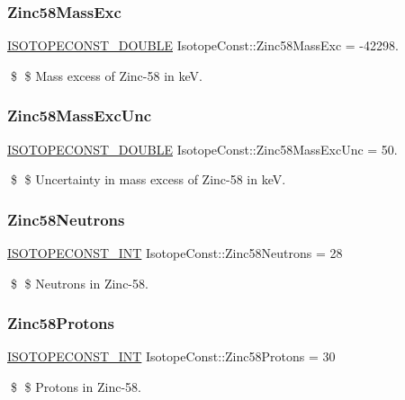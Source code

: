 \subsubsection{\texorpdfstring{Zinc58\+Mass\+Exc}{Zinc58MassExc}}
{\footnotesize\ttfamily \mbox{\hyperlink{group___isotope_const-_macros_ga8f45a7272ce02c0b4c65c44636ed719a}{I\+S\+O\+T\+O\+P\+E\+C\+O\+N\+S\+T\+\_\+\+D\+O\+U\+B\+LE}} Isotope\+Const\+::\+Zinc58\+Mass\+Exc = -\/42298.}

\$ \$ Mass excess of Zinc-\/58 in keV. \mbox{\label{group___isotope_const-_zinc-_zn58_gad4aec4b49abe58001986ed6b78dc700b}} 
\subsubsection{\texorpdfstring{Zinc58\+Mass\+Exc\+Unc}{Zinc58MassExcUnc}}
{\footnotesize\ttfamily \mbox{\hyperlink{group___isotope_const-_macros_ga8f45a7272ce02c0b4c65c44636ed719a}{I\+S\+O\+T\+O\+P\+E\+C\+O\+N\+S\+T\+\_\+\+D\+O\+U\+B\+LE}} Isotope\+Const\+::\+Zinc58\+Mass\+Exc\+Unc = 50.}

\$ \$ Uncertainty in mass excess of Zinc-\/58 in keV. \mbox{\label{group___isotope_const-_zinc-_zn58_ga3996e502b770c74c47dfb70d0cb6642f}} 
\subsubsection{\texorpdfstring{Zinc58\+Neutrons}{Zinc58Neutrons}}
{\footnotesize\ttfamily \mbox{\hyperlink{group___isotope_const-_macros_ga5f18360b3e99483a35c32d789e62621c}{I\+S\+O\+T\+O\+P\+E\+C\+O\+N\+S\+T\+\_\+\+I\+NT}} Isotope\+Const\+::\+Zinc58\+Neutrons = 28}

\$ \$ Neutrons in Zinc-\/58. \mbox{\label{group___isotope_const-_zinc-_zn58_gac6312fc47aa8f951f031daf50f0cc7b2}} 
\subsubsection{\texorpdfstring{Zinc58\+Protons}{Zinc58Protons}}
{\footnotesize\ttfamily \mbox{\hyperlink{group___isotope_const-_macros_ga5f18360b3e99483a35c32d789e62621c}{I\+S\+O\+T\+O\+P\+E\+C\+O\+N\+S\+T\+\_\+\+I\+NT}} Isotope\+Const\+::\+Zinc58\+Protons = 30}

\$ \$ Protons in Zinc-\/58. 